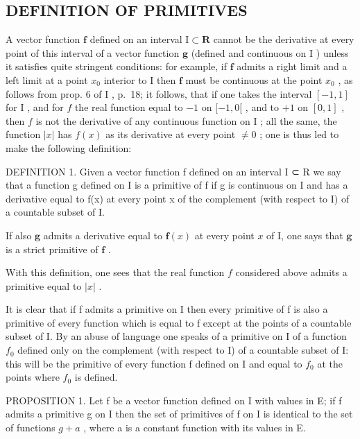 \subsection{DEFINITION OF PRIMITIVES}

A vector function \(\mathbf{f}\) defined on an interval \(\mathrm{I} \subset \mathbf{R}\) cannot be the derivative at every point of this interval of a vector function \(\mathbf{g}\) (defined and continuous on \(\mathrm{I}\) ) unless it satisfies quite stringent conditions: for example, if \(\mathbf{f}\) admits a right limit and a left limit at a point \(x_0\) interior to \(\mathrm{I}\) then \(\mathbf{f}\) must be continuous at the point \(x_0\) , as follows from prop. 6 of \(\mathrm{I}\) , p.~18; it follows, that if one takes the interval \([-1, 1]\) for \(\mathrm{I}\) , and for \(f\) the real function equal to \(-1\) on \([-1, 0[\) , and to \(+1\) on \([0, 1]\) , then \(f\) is not the derivative of any continuous function on \(\mathrm{I}\) ; all the same, the function \(|x|\) has \(f(x)\) as its derivative at every point \(\neq 0\) ; one is thus led to make the following definition:

DEFINITION 1. Given a vector function f defined on an interval I ⊂ R we say that a function g defined on I is a primitive of f if g is continuous on I and has a derivative equal to f(x) at every point x of the complement (with respect to I) of a countable subset of I.

If also \(\mathbf{g}\) admits a derivative equal to \(\mathbf{f}(x)\) at every point \(x\) of I, one says that \(\mathbf{g}\) is a strict primitive of \(\mathbf{f}\) .

With this definition, one sees that the real function \(f\) considered above admits a primitive equal to \(|x|\) .

It is clear that if f admits a primitive on I then every primitive of f is also a primitive of every function which is equal to f except at the points of a countable subset of I. By an abuse of language one speaks of a primitive on I of a function \(f_{0}\) defined only on the complement (with respect to I) of a countable subset of I: this will be the primitive of every function f defined on I and equal to \(f_{0}\) at the points where \(f_{0}\) is defined.

PROPOSITION 1. Let f be a vector function defined on I with values in E; if f admits a primitive g on I then the set of primitives of f on I is identical to the set of functions \(g + a\) , where a is a constant function with its values in E.

